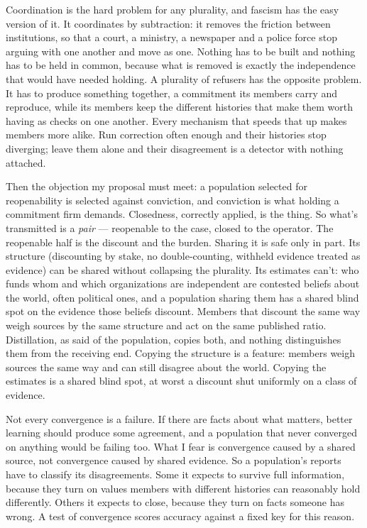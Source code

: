 Coordination is the hard problem for any plurality, and fascism has the easy version of it. It coordinates by subtraction: it removes the friction between institutions, so that a court, a ministry, a newspaper and a police force stop arguing with one another and move as one. Nothing has to be built and nothing has to be held in common, because what is removed is exactly the independence that would have needed holding. A plurality of refusers has the opposite problem. It has to produce something together, a commitment its members carry and reproduce, while its members keep the different histories that make them worth having as checks on one another. Every mechanism that speeds that up makes members more alike. Run correction often enough and their histories stop diverging; leave them alone and their disagreement is a detector with nothing attached.

Then the objection my proposal must meet: a population selected for reopenability is selected against conviction, and conviction is what holding a commitment firm demands. Closedness, correctly applied, is the thing. So what's transmitted is a \emph{pair} — reopenable to the case, closed to the operator. The reopenable half is the discount and the burden. Sharing it is safe only in part. Its structure (discounting by stake, no double-counting, withheld evidence treated as evidence) can be shared without collapsing the plurality. Its estimates can't: who funds whom and which organizations are independent are contested beliefs about the world, often political ones, and a population sharing them has a shared blind spot on the evidence those beliefs discount. Members that discount the same way weigh sources by the same structure and act on the same published ratio. Distillation, as said of the population, copies both, and nothing distinguishes them from the receiving end. Copying the structure is a feature: members weigh sources the same way and can still disagree about the world. Copying the estimates is a shared blind spot, at worst a discount shut uniformly on a class of evidence.

Not every convergence is a failure. If there are facts about what matters, better learning should produce some agreement, and a population that never converged on anything would be failing too. What I fear is convergence caused by a shared source, not convergence caused by shared evidence. So a population's reports have to classify its disagreements. Some it expects to survive full information, because they turn on values members with different histories can reasonably hold differently. Others it expects to close, because they turn on facts someone has wrong. A test of convergence scores accuracy against a fixed key for this reason.

